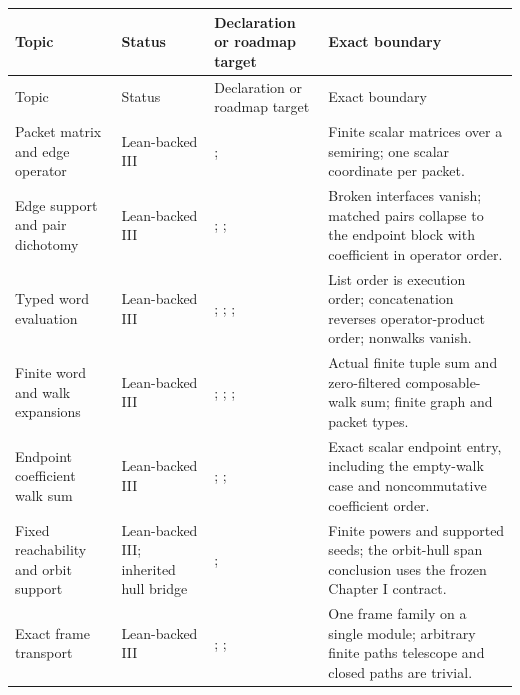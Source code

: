 \small
\begin{longtable}{L{0.17\textwidth}L{0.18\textwidth}L{0.25\textwidth}L{0.22\textwidth}}
\toprule
Topic & Status & Declaration or roadmap target & Exact boundary\\
\midrule
\endfirsthead
\toprule
Topic & Status & Declaration or roadmap target & Exact boundary\\
\midrule
\endhead
Packet matrix and edge operator
& Lean-backed III
& ; 
& Finite scalar matrices over a semiring; one scalar coordinate per packet.\\
\addlinespace
Edge support and pair dichotomy
& Lean-backed III
& ; ; 
& Broken interfaces vanish; matched pairs collapse to the endpoint block with coefficient in operator order.\\
\addlinespace
Typed word evaluation
& Lean-backed III
& ; ; ; 
& List order is execution order; concatenation reverses operator-product order; nonwalks vanish.\\
\addlinespace
Finite word and walk expansions
& Lean-backed III
& ; ; ; 
& Actual finite tuple sum and zero-filtered composable-walk sum; finite graph and packet types.\\
\addlinespace
Endpoint coefficient walk sum
& Lean-backed III
& ; ; 
& Exact scalar endpoint entry, including the empty-walk case and noncommutative coefficient order.\\
\addlinespace
Fixed reachability and orbit support
& Lean-backed III; inherited hull bridge
& ; 
& Finite powers and supported seeds; the orbit-hull span conclusion uses the frozen Chapter I contract.\\
\addlinespace
Exact frame transport
& Lean-backed III
& ; ; 
& One frame family on a single module; arbitrary finite paths telescope and closed paths are trivial.\\

\end{longtable}

